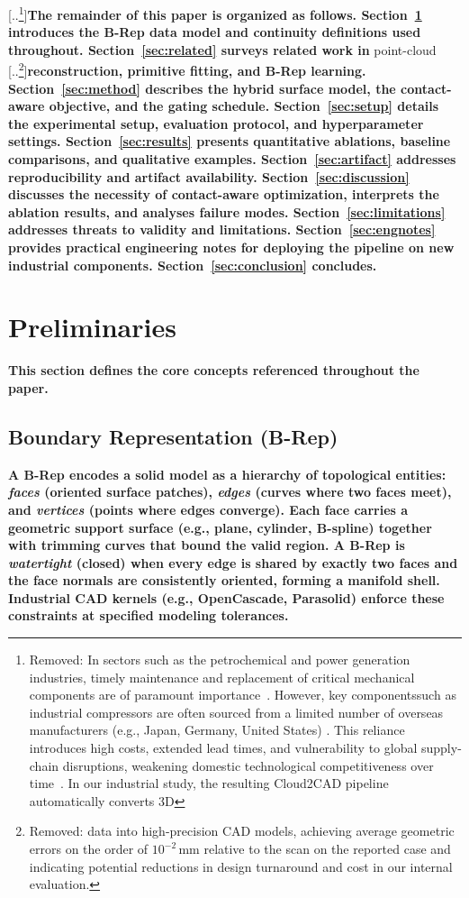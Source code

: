\documentclass{ieeeaccess}
\providecommand{\DIFaddtex}[1]{{\color{blue}\bfseries #1}} %
\providecommand{\DIFdeltex}[1]{{\color{red}[..\footnote{\color{black}Removed: #1}]}} %
\providecommand{\DIFaddbegin}{} %
\providecommand{\DIFaddend}{} %
\providecommand{\DIFdelbegin}{} %
\providecommand{\DIFdelend}{} %
\providecommand{\DIFadd}[1]{\texorpdfstring{\DIFaddtex{#1}}{#1}} %
\providecommand{\DIFdel}[1]{\texorpdfstring{\DIFdeltex{#1}}{}} %
\begin{document}
\DIFdelbegin \DIFdel{In sectors such as the petrochemical and power generation industries, timely maintenance and replacement of critical mechanical components are of paramount importance~\cite{b16,b25}.
However, key componentssuch as industrial compressors are often sourced from a limited number of overseas manufacturers (e.g., Japan, Germany, United States)
. This reliance introduces high costs, extended lead times, and vulnerability to global supply-chain disruptions, weakening domestic technological competitiveness over time~\cite{b16}.
In our industrial study, the resulting Cloud2CAD pipeline automatically converts 3D }\DIFdelend \DIFaddbegin \DIFadd{The remainder of this paper is organized as follows.
Section~\ref{sec:prelim} introduces the B-Rep data model and continuity definitions used throughout.
Section~\ref{sec:related} surveys related work in }\DIFaddend point-cloud \DIFdelbegin \DIFdel{data into high-precision CAD models, achieving average geometric errors on the order of $10^{-2}$\,mm relative to the scan on the reported case and indicating potential reductions in design turnaround and cost in our internal evaluation.
}\DIFdelend \DIFaddbegin \DIFadd{reconstruction, primitive fitting, and B-Rep learning.
Section~\ref{sec:method} describes the hybrid surface model, the contact-aware objective, and the gating schedule.
Section~\ref{sec:setup} details the experimental setup, evaluation protocol, and hyperparameter settings.
Section~\ref{sec:results} presents quantitative ablations, baseline comparisons, and qualitative examples.
Section~\ref{sec:artifact} addresses reproducibility and artifact availability.
Section~\ref{sec:discussion} discusses the necessity of contact-aware optimization, interprets the ablation results, and analyses failure modes.
Section~\ref{sec:limitations} addresses threats to validity and limitations.
Section~\ref{sec:engnotes} provides practical engineering notes for deploying the pipeline on new industrial components.
Section~\ref{sec:conclusion} concludes.
}\DIFaddend 


\DIFaddbegin \section{\DIFadd{Preliminaries}}
\label{sec:prelim}

\DIFadd{This section defines the core concepts referenced throughout the paper.
}

\subsection{\DIFadd{Boundary Representation (B-Rep)}}
\DIFadd{A B-Rep encodes a solid model as a hierarchy of topological entities:
\emph{faces} (oriented surface patches), \emph{edges} (curves where two faces meet),
and \emph{vertices} (points where edges converge).
Each face carries a geometric support surface (e.g., plane, cylinder, B-spline)
together with trimming curves that bound the valid region.
A B-Rep is \emph{watertight} (closed) when every edge is shared by exactly two faces
and the face normals are consistently oriented, forming a manifold shell.
Industrial CAD kernels (e.g., OpenCascade, Parasolid) enforce these
constraints at specified modeling tolerances.
}
\end{document}
